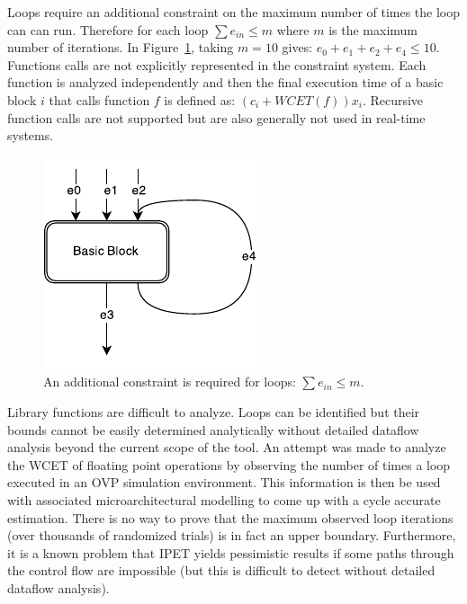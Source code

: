 \documentclass[table,11pt]{article}
\begin{document}
Loops require an additional constraint on the maximum number of times the loop can can run. Therefore for each loop $\sum e_{in} \leq m$ where $m$ is the maximum number of iterations. In Figure~\ref{f:loopedges}, taking $m=10$ gives: $e_0 + e_1 + e_2 + e_4 \leq 10$. Functions calls are not explicitly represented in the constraint system. Each function is analyzed independently and then the final execution time of a basic block $i$ that calls function $f$ is defined as: 
  $(c_i+WCET(f))x_i$. Recursive function calls are not supported but are also generally not used in real-time systems.



\begin{figure}[h]
\centering
\includegraphics[scale=1]{figures/loopedges.pdf}
\caption{An additional constraint is required for loops: $\sum e_{in} \leq m$.} 
\label{f:loopedges}
\end{figure}


Library functions are difficult to analyze. Loops can be identified but their bounds cannot be easily determined analytically without detailed dataflow analysis beyond the current scope of the tool. An attempt was made to analyze the WCET of floating point operations by observing the number of times a loop executed in an OVP simulation environment. This information is then be used with associated microarchitectural modelling to come up with a cycle accurate estimation. There is no way to prove that the maximum observed loop iterations (over thousands of randomized trials) is in fact an upper boundary. Furthermore, it is a known problem that IPET yields pessimistic results if some paths through the control flow are impossible (but this is difficult to detect without detailed dataflow analysis). 
\end{document}
